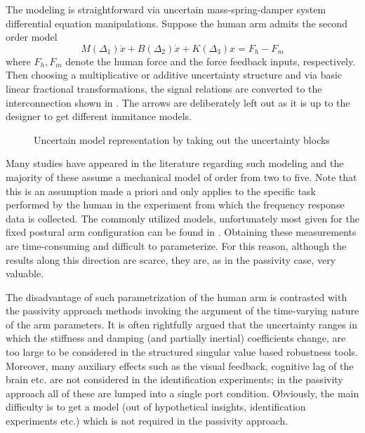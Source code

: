 The modeling is straightforward via uncertain mass-spring-damper system differential equation manipulations. Suppose the human arm
admits the second order model
\[
M(\Delta_1)\ddot{x} + B(\Delta_2)\dot{x} + K(\Delta_3)x = F_h -F_m
\] 
where $F_h,F_m$ denote the human force and the force feedback inputs, respectively. Then choosing a multiplicative or additive uncertainty 
structure and via basic linear fractional transformations, the signal relations are converted to the interconnection shown in 
. The arrows are deliberately left out as it is up to the designer to get different immitance models.
\begin{figure}%
\centering
{}
\caption{Uncertain model representation by taking out the uncertainty blocks}%
\label{fig:lit:figunc}%
\end{figure}


Many studies have appeared in the literature regarding such modeling and the majority of these assume a 
mechanical model of order from two to five. Note that this is an assumption made a priori and only applies 
to the specific task performed by the human in the experiment from which the frequency response data is 
collected. The commonly utilized models, unfortunately most given for the fixed postural arm 
configuration can be found in \cite{kazeroonitsay,tsujigoto,kosuge,colgate1,speich,fucavus,buergerhogan1,leungfa,
husalculoewen,andrifour,laroche}. Obtaining these measurements are time-consuming and difficult to parameterize. For this reason, although
the results along this direction are scarce, they are, as in the passivity case, very valuable. 

The disadvantage of such parametrization of the human arm is contrasted with the passivity approach methods
invoking the argument of the time-varying nature of the arm parameters. It is often rightfully argued that the 
uncertainty ranges in which the stiffness and damping (and partially inertial) coefficients change, are too 
large to be considered in the structured singular value based robustness tools. Moreover, many auxiliary 
effects such as the visual feedback, cognitive lag of the brain etc. are not considered in the identification 
experiments; in the passivity approach all of these are lumped into a single port condition. Obviously, 
the main difficulty is to get a model (out of hypothetical insights, identification experiments etc.) which is
not required in the passivity approach.


